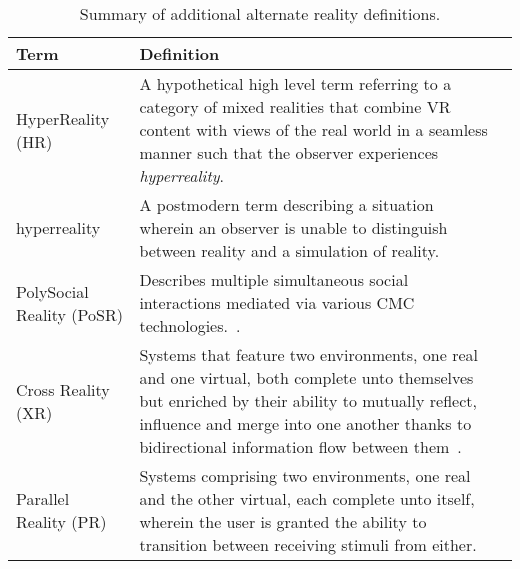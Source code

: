 \begin{table}[h]
\begin{center}
\begin{tabularx}{\textwidth}{l *{2}{>{\centering\arraybackslash}X}}

\toprule

\textbf{Term} & \textbf{Definition} \\

\midrule

		
HyperReality (HR) & A hypothetical high level term referring to a category of mixed realities that combine VR content with views of the real world in a seamless manner such that the observer experiences \textit{hyperreality}. \\
		
\midrule
		

hyperreality & A postmodern term describing a situation wherein an observer is unable to distinguish between reality and a simulation of reality. \\

\midrule

		
PolySocial Reality (PoSR) & Describes multiple simultaneous social interactions mediated via various CMC technologies.~\cite{Applin2012}. \\

\midrule


Cross Reality (XR) & Systems that feature two environments, one real and one virtual, both complete unto themselves~\cite{lifton:merging} but enriched by their ability to mutually reflect, influence and merge into one another thanks to bidirectional information flow between them~\cite{kim:practical}. \\

\midrule


Parallel Reality (PR) & Systems comprising two environments, one real and the other virtual, each complete unto itself, wherein the user is granted the ability to transition between receiving stimuli from either. \\


\bottomrule
\end{tabularx}
\end{center}
\caption{Summary of additional alternate reality definitions.}
\end{table}

